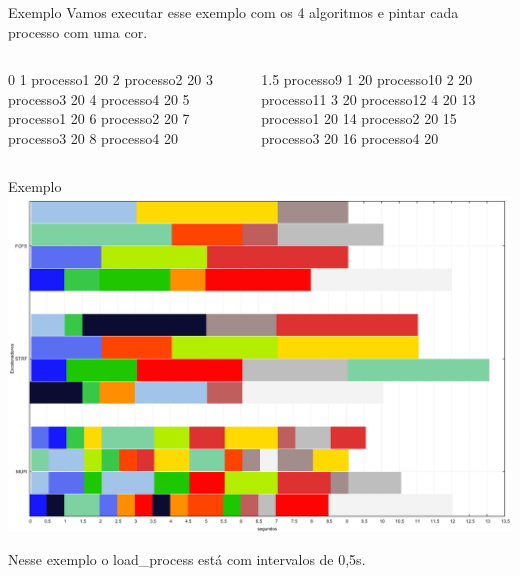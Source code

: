 \documentclass{beamer}
\begin{document}
\begin{frame}{Exemplo}
	Vamos executar esse exemplo com os 4 algoritmos e pintar cada processo com uma cor.
	\begin{columns}[T,onlytextwidth]
		
		0 1 processo1 20  2 processo2 20  3 processo3 20  4 processo4 20  5 processo1 20  6 processo2 20  7 processo3 20  8 processo4 20 \newline
		
		
		
		
		1.5 processo9 1 20  processo10 2 20  processo11 3 20  processo12 4 20  13 processo1 20  14 processo2 20  15 processo3 20  16 processo4 20
		
		
	\end{columns}
\end{frame}

\begin{frame}{Exemplo}
	\includegraphics[width=\textwidth]{graphs/comparacao}
	
	{\tiny *Nesse exemplo o load\_process está com intervalos de 0,5s.}
\end{frame}
\end{document}
